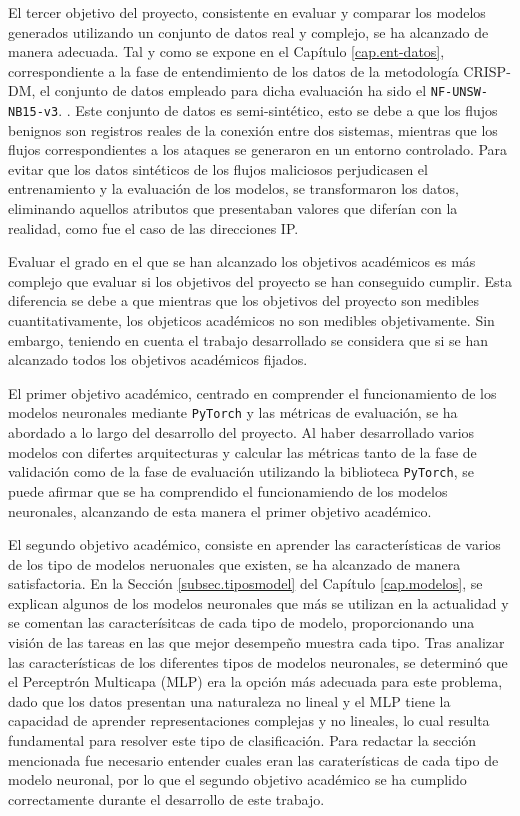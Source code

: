 El tercer objetivo del proyecto, consistente en evaluar y comparar los modelos generados utilizando un conjunto de datos real y complejo, se ha alcanzado de manera adecuada. Tal y como se expone en el Capítulo \ref{cap.ent-datos}, correspondiente a la fase de entendimiento de los datos de la metodología CRISP-DM, el conjunto de datos empleado para dicha evaluación ha sido el \texttt{NF-UNSW-NB15-v3}. \cite{luay2025NetFlowDatasetsV3}. Este conjunto de datos es semi-sintético, esto se debe a que los flujos benignos son registros reales de la conexión entre dos sistemas, mientras que los flujos correspondientes a los ataques se generaron en un entorno controlado. Para evitar que los datos sintéticos de los flujos maliciosos perjudicasen el entrenamiento y la evaluación de los modelos, se transformaron los datos, eliminando aquellos atributos que presentaban valores que diferían con la realidad, como fue el caso de las direcciones IP.

Evaluar el grado en el que se han alcanzado los objetivos académicos es más complejo que evaluar si los objetivos del proyecto se han conseguido cumplir. Esta diferencia se debe a que mientras que los objetivos del proyecto son medibles cuantitativamente, los objeticos académicos no son medibles objetivamente. Sin embargo, teniendo en cuenta el trabajo desarrollado se considera que si se han alcanzado todos los objetivos académicos fijados.

El primer objetivo académico, centrado en comprender el funcionamiento de los modelos neuronales mediante \texttt{PyTorch} y las métricas de evaluación, se ha abordado a lo largo del desarrollo del proyecto. Al haber desarrollado varios modelos con difertes arquitecturas y calcular las métricas tanto de la fase de validación como de la fase de evaluación utilizando la biblioteca \texttt{PyTorch}, se puede afirmar que se ha comprendido el funcionamiendo de los modelos neuronales, alcanzando de esta manera el primer objetivo académico.

El segundo objetivo académico, consiste en aprender las características de varios de los tipo de modelos neruonales que existen, se ha alcanzado de manera satisfactoria. En la Sección \ref{subsec.tiposmodel} del Capítulo \ref{cap.modelos}, se explican algunos de los modelos neuronales que más se utilizan en la actualidad y se comentan las caracterísitcas de cada tipo de modelo, proporcionando una visión de las tareas en las que mejor desempeño muestra cada tipo. Tras analizar las características de los diferentes tipos de modelos neuronales, se determinó que el Perceptrón Multicapa (MLP) era la opción más adecuada para este problema, dado que los datos presentan una naturaleza no lineal y el MLP tiene la capacidad de aprender representaciones complejas y no lineales, lo cual resulta fundamental para resolver este tipo de clasificación. Para redactar la sección mencionada fue necesario entender cuales eran las caraterísticas de cada tipo de modelo neuronal, por lo que el segundo objetivo académico se ha cumplido correctamente durante el desarrollo de este trabajo.

